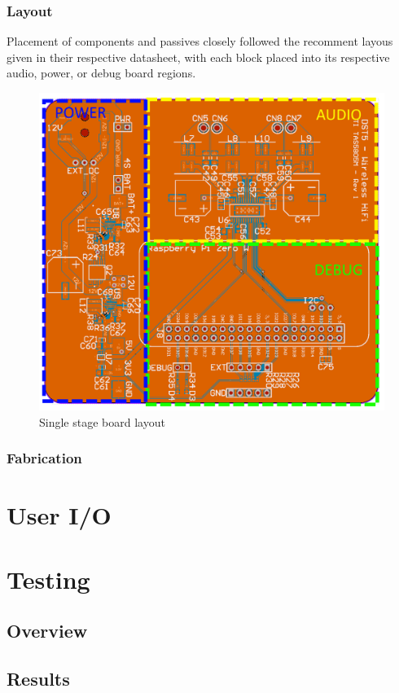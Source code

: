 \documentclass[main.tex]{subfiles}
\begin{document}
\subsubsection{Layout}

Placement of components and passives closely followed the recomment layous given in their respective datasheet, with each block placed into its respective audio, power, or debug board regions. 

\begin{figure}[H]
    \centering
    \includegraphics[scale=0.4]{./figs/ti-pcb.png}
    \caption{Single stage board layout}
    \label{fig:ti-pcb}
\end{figure}

\subsubsection{Fabrication}



\section{User I/O}
\section{Testing}
\subsection{Overview}
\subsection{Results}
\end{document}
